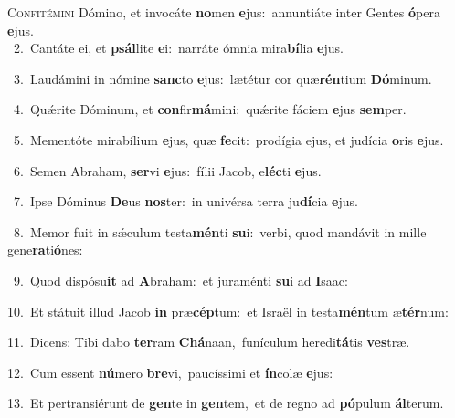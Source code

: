 \lettrine{\initial\textcolor{\initialcolor}{C}}{onfitémini} Dómino, et invocáte \textbf{no}\-men \textbf{e}\-jus:~\star annuntiáte inter Gentes \textbf{ó}\-pera \textbf{e}\-jus.\\
{\numbfont\textcolor{\numbcolor}{~2.}}~Cantáte ei, et \textbf{psál}\-lite \textbf{e}\-i:~\star narráte ómnia mira\-\textbf{bí}\-lia \textbf{e}\-jus.\par
{\numbfont\textcolor{\numbcolor}{~3.}}~Laudámini in nómine \textbf{sanc}\-to \textbf{e}\-jus:~\star lætétur cor quæ\-\textbf{rén}\-tium \textbf{Dó}\-minum.\par
{\numbfont\textcolor{\numbcolor}{~4.}}~Quǽrite Dóminum, et \textbf{con}\-fir\-\textbf{má}\-mini:~\star quǽrite fáciem \textbf{e}\-jus \textbf{sem}\-per.\par
{\numbfont\textcolor{\numbcolor}{~5.}}~Mementóte mirabílium \textbf{e}\-jus, quæ \textbf{fe}\-cit:~\star prodígia ejus, et judícia \textbf{o}\-ris \textbf{e}\-jus.\par
{\numbfont\textcolor{\numbcolor}{~6.}}~Semen Abraham, \textbf{ser}\-vi \textbf{e}\-jus:~\star fílii Jacob, e\-\textbf{léc}\-ti \textbf{e}\-jus.\par
{\numbfont\textcolor{\numbcolor}{~7.}}~Ipse Dóminus \textbf{De}\-us \textbf{nos}\-ter:~\star in univérsa terra ju\-\textbf{dí}\-cia \textbf{e}\-jus.\par
{\numbfont\textcolor{\numbcolor}{~8.}}~Memor fuit in sǽculum testa\-\textbf{mén}\-ti \textbf{su}\-i:~\star verbi, quod mandávit in mille gene\-\textbf{ra}\-ti\-\textbf{ó}\-nes:\par
{\numbfont\textcolor{\numbcolor}{~9.}}~Quod dispósu\textbf{it} ad \textbf{A}\-braham:~\star et juraménti \textbf{su}\-i ad \textbf{I}\-saac:\par
{\numbfont\textcolor{\numbcolor}{10.}}~Et státuit illud Jacob \textbf{in} præ\-\textbf{cép}\-tum:~\star et Israël in testa\-\textbf{mén}\-tum æ\-\textbf{tér}\-num:\par
{\numbfont\textcolor{\numbcolor}{11.}}~Dicens: Tibi dabo \textbf{ter}\-ram \textbf{Chá}\-naan,~\star funículum heredi\-\textbf{tá}\-tis \textbf{ves}\-træ.\par
{\numbfont\textcolor{\numbcolor}{12.}}~Cum essent \textbf{nú}\-mero \textbf{bre}\-vi,~\star paucíssimi et \textbf{ín}\-colæ \textbf{e}\-jus:\par
{\numbfont\textcolor{\numbcolor}{13.}}~Et pertransiérunt de \textbf{gen}\-te in \textbf{gen}\-tem,~\star et de regno ad \textbf{pó}\-pulum \textbf{ál}\-terum.\par
